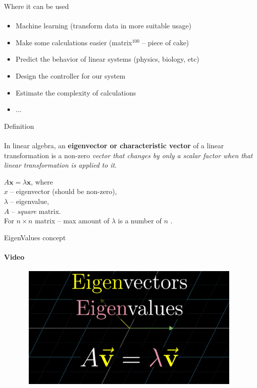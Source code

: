 \documentclass[aspectratio=169]{beamer}
\begin{document}
\begin{frame}[t]{Where it can be used}
\framesubtitle{}
    \begin{itemize}
        \item Machine learning (transform data in more suitable usage)
        \item Make some calculations easier (matrix$^100$ – piece of cake)
        \item Predict the behavior of linear systems (physics, biology, etc)
        \item Design the controller for our system
        \item Estimate the complexity of calculations
        \item ...
    \end{itemize}
\end{frame}

\begin{frame}[t]{Definition}
\framesubtitle{}
\Large 
In linear algebra, an \textbf{eigenvector or characteristic vector }of a linear transformation is a non-zero \textit{vector that changes by only a scalar factor when that linear transformation is applied to it}. 
\bigskip

$ A\mathbf{x}=\lambda\mathbf{x}$, where \\ 
$x$ -- eigenvector (should be non-zero), \\ 
$\lambda$ -- eigenvalue, \\ 
$A$ -- \textit{square} matrix. \\ 
For $n \times n$ matrix -- max amount of $\lambda$ is a number of $n$ .
\end{frame}

\begin{frame}[t]{EigenValues concept}
    \framesubtitle{Video}
    \vspace{-0.6cm}
    \begin{figure}[H]
        \href{https://youtu.be/PFDu9oVAE-g}{
            \centering\includegraphics[height=6cm,width=1\textwidth,keepaspectratio]{eigenvideo_brown.jpg}}
        \label{fig:eigenvideo_brown.jpg}
    \end{figure}
\end{frame}
\end{document}
